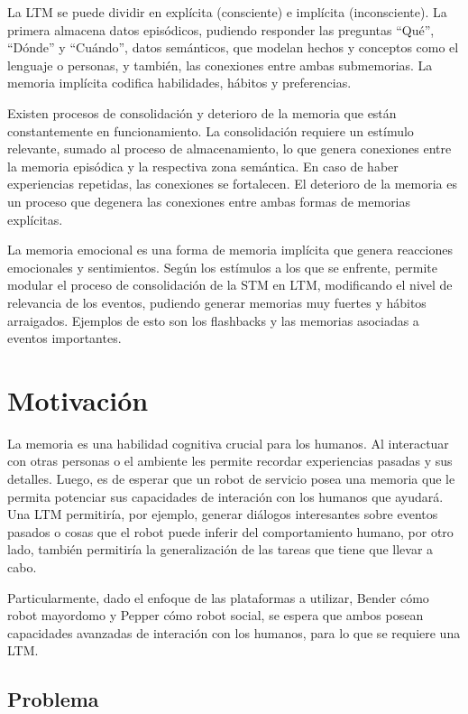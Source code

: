 La LTM se puede dividir en expl\'icita (consciente) e impl\'icita (inconsciente). La primera almacena datos epis\'odicos, pudiendo responder las preguntas ``Qu\'e'', ``D\'onde'' y ``Cu\'ando'', datos sem\'anticos, que modelan hechos y conceptos como el lenguaje o personas, y tambi\'en, las conexiones entre ambas submemorias. La memoria impl\'icita codifica habilidades, h\'abitos y preferencias.

Existen procesos de consolidaci\'on y deterioro de la memoria que est\'an constantemente en funcionamiento. La consolidaci\'on requiere un est\'imulo relevante, sumado al proceso de almacenamiento, lo que genera conexiones entre la memoria epis\'odica y la respectiva zona sem\'antica. En caso de haber experiencias repetidas, las conexiones se fortalecen. El deterioro de la memoria es un proceso que degenera las conexiones entre ambas formas de memorias expl\'icitas.

La memoria emocional es una forma de memoria impl\'icita que genera reacciones emocionales y sentimientos. Seg\'un los est\'imulos a los que se enfrente, permite modular el proceso de consolidaci\'on de la STM en LTM, modificando el nivel de relevancia de los eventos, pudiendo generar memorias muy fuertes y h\'abitos arraigados. Ejemplos de esto son los flashbacks y las memorias asociadas a eventos importantes.



\section{Motivaci\'on}

La memoria es una habilidad cognitiva crucial para los humanos. Al interactuar con otras personas o el ambiente les permite recordar experiencias pasadas y sus detalles. Luego, es de esperar que un robot de servicio posea una memoria que le permita potenciar sus capacidades de interaci\'on con los humanos que ayudar\'a\cite{Vijayakumar2014}. Una LTM permitir\'ia, por ejemplo, generar di\'alogos interesantes sobre eventos pasados o cosas que el robot puede inferir del comportamiento humano, por otro lado, tambi\'en permitir\'ia la generalizaci\'on de las tareas que tiene que llevar a cabo.

Particularmente, dado el enfoque de las plataformas a utilizar, Bender c\'omo robot mayordomo y Pepper c\'omo robot social, se espera que ambos posean capacidades avanzadas de interaci\'on con los humanos, para lo que se requiere una LTM.


\subsection{Problema}

